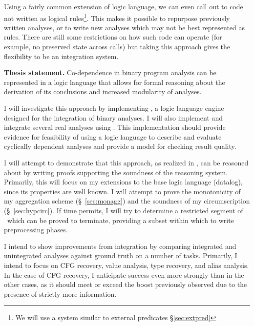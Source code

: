 Using a fairly common extension of logic language, we can even call out to code not written as logical rules\footnote{We will use a system similar to external predicates \S\ref{sec:extpred}}.
This makes it possible to repurpose previously written analyses, or to write new analyses which may not be best represented as rules.
There are still some restrictions on how such code can operate (for example, no preserved state across calls) but taking this approach gives the flexibility to be an integration system.

\begin{inset}
{\bf Thesis statement.}
Co-dependence in binary program analysis can be represented in a logic language that allows for formal reasoning about the derivation of its conclusions and increased modularity of analyses.
\end{inset}

I will investigate this approach by implementing \sysname, a logic language engine designed for the integration of binary analyses.
I will also implement and integrate several real analyses using \sysname.
This implementation should provide evidence for feasibility of using a logic language to describe and evaluate cyclically dependent analyses and provide a model for checking result quality.

I will attempt to demonstrate that this approach, as realized in \sysname, can be reasoned about by writing proofs supporting the soundness of the reasoning system.
Primarily, this will focus on my extensions to the base logic language (datalog), since its properties are well known.
I will attempt to prove the monotonicity of my aggregation scheme (\S~\ref{sec:monagg}) and the soundness of my circumscription (\S~\ref{sec:hypcirc}).
If time permits, I will try to determine a restricted segment of \sysname\ which can be proved to terminate, providing a subset within which to write preprocessing phases.

I intend to show improvements from integration by comparing integrated and unintegrated analyses against ground truth on a number of tasks.
Primarily, I intend to focus on CFG recovery, value analysis, type recovery, and alias analysis.
In the case of CFG recovery, I anticipate success even more strongly than in the other cases, as it should meet or exceed the boost previously observed\cite{jakstab} due to the presence of strictly more information.
